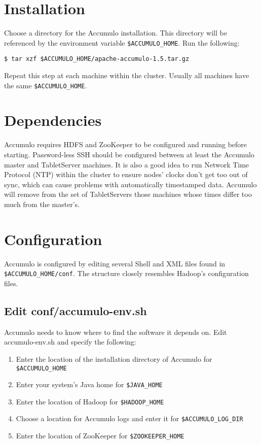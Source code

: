 \section{Installation}
Choose a directory for the Accumulo installation. This directory will be referenced
by the environment variable \texttt{\$ACCUMULO\_HOME}. Run the following:

\small
\begin{verbatim}
$ tar xzf $ACCUMULO_HOME/apache-accumulo-1.5.tar.gz
\end{verbatim}
\normalsize

Repeat this step at each machine within the cluster. Usually all machines have the
same \texttt{\$ACCUMULO\_HOME}.

\section{Dependencies}
Accumulo requires HDFS and ZooKeeper to be configured and running
before starting. Password-less SSH should be configured between at least the
Accumulo master and TabletServer machines. It is also a good idea to run Network
Time Protocol (NTP) within the cluster to ensure nodes' clocks don't get too out of
sync, which can cause problems with automatically timestamped data. Accumulo
will remove from the set of TabletServers those machines whose times differ too
much from the master's.

\section{Configuration}

Accumulo is configured by editing several Shell and XML files found in
\texttt{\$ACCUMULO\_HOME/conf}. The structure closely resembles Hadoop's configuration
files.

\subsection{Edit conf/accumulo-env.sh}

Accumulo needs to know where to find the software it depends on. Edit accumulo-env.sh 
and specify the following:

\begin{enumerate}
\item{Enter the location of the installation directory of Accumulo for \texttt{\$ACCUMULO\_HOME}}
\item{Enter your system's Java home for \texttt{\$JAVA\_HOME}}
\item{Enter the location of Hadoop for \texttt{\$HADOOP\_HOME}}
\item{Choose a location for Accumulo logs and enter it for \texttt{\$ACCUMULO\_LOG\_DIR}}
\item{Enter the location of ZooKeeper for \texttt{\$ZOOKEEPER\_HOME}}
\end{enumerate}

